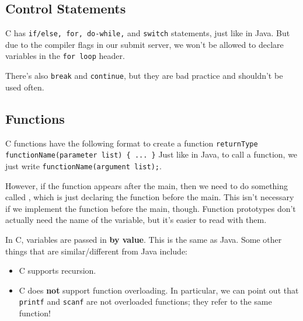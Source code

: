 



\subsection{Control Statements}
C has \verb!if/else, for, do-while,! and \verb!switch! statements, just like in Java. But due to the compiler flags in our submit server, we won't be allowed to declare variables in the \verb!for loop! header. 

There's also \verb!break! and \verb!continue!, but they are bad practice and shouldn't be used often.


\subsection{Functions}
C functions have the following format to create a function \verb!returnType functionName(parameter list) { ... }! Just like in Java, to call a function, we just write \verb!functionName(argument list);!. 

However, if the function appears after the main, then we need to do something called , which is just declaring the function before the main. This isn't necessary if we implement the function before the main, though. Function prototypes don't actually need the name of the variable, but it's easier to read with them.


In C, variables are passed in \textbf{by value}. This is the same as Java. Some other things that are similar/different from Java include: \begin{itemize}
    \item C supports recursion.
    \item C does \textbf{not} support function overloading. In particular, we can point out that \verb!printf! and \verb!scanf! are not overloaded functions; they refer to the same function!
\end{itemize}


